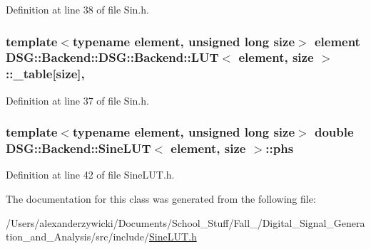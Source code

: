 Definition at line 38 of file Sin.\+h.

\hypertarget{classDSG_1_1Backend_1_1DSG_1_1Backend_1_1LUT_a427da4b7eccdfe25e3c1889a8c2fdea6}{
\subsubsection[{\+\_\+table}]{\setlength{\rightskip}{0pt plus 5cm}template$<$typename element, unsigned long size$>$ element {\bf D\+S\+G\+::\+Backend\+::\+D\+S\+G\+::\+Backend\+::\+L\+U\+T}$<$ element, size $>$\+::\+\_\+table\mbox{[}size\mbox{]}\hspace{0.3cm}{\ttfamily [protected]}, {\ttfamily [inherited]}}}\label{classDSG_1_1Backend_1_1DSG_1_1Backend_1_1LUT_a427da4b7eccdfe25e3c1889a8c2fdea6}


Definition at line 37 of file Sin.\+h.

\hypertarget{classDSG_1_1Backend_1_1SineLUT_a4745a2ef3a5cec8f2822fa12174e059b}{
\subsubsection[{phs}]{\setlength{\rightskip}{0pt plus 5cm}template$<$typename element, unsigned long size$>$ double {\bf D\+S\+G\+::\+Backend\+::\+Sine\+L\+U\+T}$<$ element, size $>$\+::phs\hspace{0.3cm}{\ttfamily [protected]}}}\label{classDSG_1_1Backend_1_1SineLUT_a4745a2ef3a5cec8f2822fa12174e059b}


Definition at line 42 of file Sine\+L\+U\+T.\+h.



The documentation for this class was generated from the following file\+:\begin{DoxyCompactItemize}
\item 
/\+Users/alexanderzywicki/\+Documents/\+School\+\_\+\+Stuff/\+Fall\+\_/\+Digital\+\_\+\+Signal\+\_\+\+Generation\+\_\+and\+\_\+\+Analysis/src/include/\hyperlink{SineLUT_8h}{Sine\+L\+U\+T.\+h}\end{DoxyCompactItemize}
